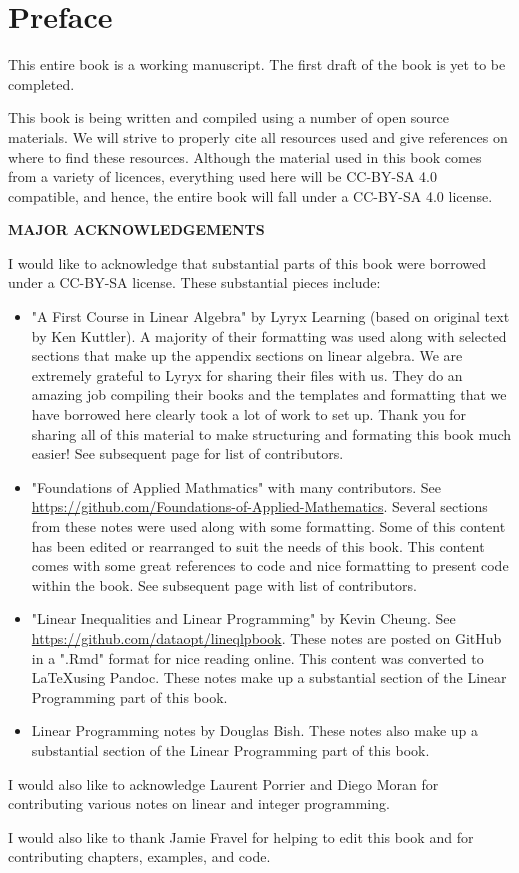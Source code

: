 \chapter*{Preface}

This entire book is a working manuscript.  The first draft of the book is yet to be completed.

This book is being written and compiled using a number of open source materials.   We will  strive to properly cite all resources used and give references on where to find these resources.  Although the material used in this book comes from a variety of licences, everything used here will be CC-BY-SA 4.0 compatible, and hence, the entire book will fall under a CC-BY-SA 4.0 license.


\begin{center}
\fontsize{14pt}{16pt}\selectfont\textcolor{titletextcolour}{\textbf{MAJOR ACKNOWLEDGEMENTS}}
\end{center}

I would like to acknowledge that substantial parts of this book were borrowed under a CC-BY-SA license.   These substantial pieces include:
\begin{itemize}
\item "A First Course in Linear Algebra" by Lyryx Learning (based on original text by Ken Kuttler).   A majority of their formatting was used along with selected sections that make up the appendix sections on linear algebra. We are extremely grateful to Lyryx for sharing their files with us.  They do an amazing job compiling their books and the templates and formatting that we have borrowed here clearly took a lot of work to set up.  Thank you for sharing all of this material to make structuring and formating this book much easier! See subsequent page for list of contributors.
\item "Foundations of Applied Mathmatics" with many contributors.  See \url{https://github.com/Foundations-of-Applied-Mathematics}.  Several sections from these notes were used along with some formatting.  Some of this content has been edited or rearranged to suit the needs of this book.  This content comes with some great references to code and nice formatting to present code within the book.   See subsequent page with list of contributors.
\item "Linear Inequalities and Linear Programming" by 
Kevin Cheung.  See \url{https://github.com/dataopt/lineqlpbook}.  These notes are posted on GitHub in a ".Rmd" format for nice reading online.  This content was converted to \LaTeX using Pandoc.    These notes make up a substantial section of the Linear Programming part of this book.
\item Linear Programming notes by Douglas Bish.  These notes also make up a substantial section of the Linear Programming part of this book.
\end{itemize}

I would also like to acknowledge Laurent Porrier and Diego Moran for contributing various notes on linear and integer programming.   

I would also like to thank Jamie Fravel for helping to edit this book and for contributing chapters, examples, and code.

\newpage



